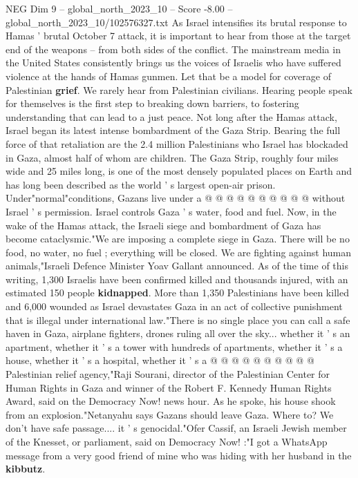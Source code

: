 \begin{textsample}{NEG Dim 9 – global\_north\_2023\_10 – Score -8.00 – global\_north\_2023\_10/102576327.txt}  \label{ex:f9_neg_039}
As Israel intensifies its brutal response to Hamas ' brutal October 7 attack, it is important to hear from those at the target end of the weapons -- from both sides of the conflict.
The mainstream media in the United States consistently brings us the voices of Israelis who have suffered violence at the hands of Hamas gunmen.
Let that be a model for coverage of Palestinian \textbf{grief}.
We rarely hear from Palestinian civilians.
Hearing people speak for themselves is the first step to breaking down barriers, to fostering understanding that can lead to a just peace.
Not long after the Hamas attack, Israel began its latest intense bombardment of the Gaza Strip.
Bearing the full force of that retaliation are the 2.4 million Palestinians who Israel has blockaded in Gaza, almost half of whom are children.
The Gaza Strip, roughly four miles wide and 25 miles long, is one of the most densely populated places on Earth and has long been described as the world ' s largest open-air prison.
Under"normal"conditions, Gazans live under a @ @ @ @ @ @ @ @ @ @ without Israel ' s permission.
Israel controls Gaza ' s water, food and fuel.
Now, in the wake of the Hamas attack, the Israeli siege and bombardment of Gaza has become cataclysmic."We are imposing a complete siege in Gaza.
There will be no food, no water, no fuel ; everything will be closed.
We are fighting against human animals,"Israeli Defence Minister Yoav Gallant announced.
As of the time of this writing, 1,300 Israelis have been confirmed killed and thousands injured, with an estimated 150 people \textbf{kidnapped}.
More than 1,350 Palestinians have been killed and 6,000 wounded as Israel devastates Gaza in an act of collective punishment that is illegal under international law."There is no single place you can call a safe haven in Gaza, airplane fighters, drones ruling all over the sky... whether it ' s an apartment, whether it ' s a tower with hundreds of apartments, whether it ' s a house, whether it ' s a hospital, whether it ' s a @ @ @ @ @ @ @ @ @ @ Palestinian relief agency,"Raji Sourani, director of the Palestinian Center for Human Rights in Gaza and winner of the Robert F.
Kennedy Human Rights Award, said on the Democracy Now! news hour.
As he spoke, his house shook from an explosion."Netanyahu says Gazans should leave Gaza.
Where to?
We don't have safe passage.... it ' s genocidal."Ofer Cassif, an Israeli Jewish member of the Knesset, or parliament, said on Democracy Now! :"I got a WhatsApp message from a very good friend of mine who was hiding with her husband in the \textbf{kibbutz}.

\end{textsample}
